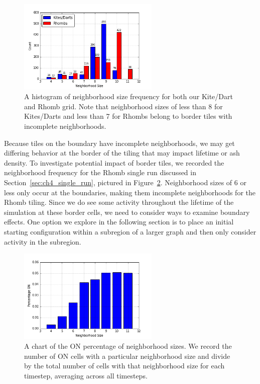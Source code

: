 \documentclass[a4paper,11pt]{report}
\begin{document}
\begin{figure}[htp]
\centering
\includegraphics[width=0.6\textwidth]{ch4_figs/both_neighborhood_size}
\caption[Kite/Dart and Rhomb Neighborhood Size Frequency]{
	A histogram of neighborhood size frequency for both our Kite/Dart and Rhomb grid. Note that neighborhood sizes of less than 8 for Kites/Darts and less than 7 for Rhombs belong to border tiles with incomplete neighborhoods.
}
\label{fig:both_neighborhood}
\end{figure}

Because tiles on the boundary have incomplete neighborhoods, we may get differing behavior at the border of the tiling that may impact lifetime or ash density. To investigate potential impact of border tiles, we recorded the neighborhood frequency for the Rhomb single run discussed in Section~\ref{sec:ch4_single_run}, pictured in Figure~\ref{fig:crh_single_nbd}. Neighborhood sizes of 6 or less only occur at the boundaries, making them incomplete neighborhoods for the Rhomb tiling. Since we do see some activity throughout the lifetime of the simulation at these border cells, we need to consider ways to examine boundary effects. One option we explore in the following section is to place an initial starting configuration within a subregion of a larger graph and then only consider activity in the subregion.

\begin{figure}[htp]
\centering
\includegraphics[width=0.6\textwidth]{ch4_figs/crh_666_neighbor_on_percent}
\caption[Rhomb Single Run Neighborhood ON Percentage]{
	A chart of the ON percentage of neighborhood sizes. We record the number of ON cells with a particular neighborhood size and divide by the total number of cells with that neighborhood size for each timestep, averaging across all timesteps.
}
\label{fig:crh_single_nbd}
\end{figure}
\end{document}
